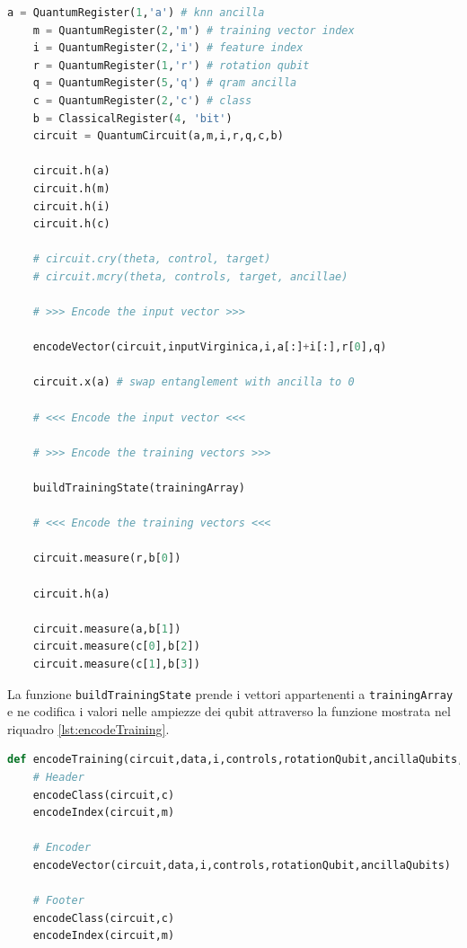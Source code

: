 \begin{lstlisting}[float=h!,language=Python,frame=tb,caption={Algoritmo per il QKNN multiclasse},label=lst:multiclasse]
    a = QuantumRegister(1,'a') # knn ancilla
    m = QuantumRegister(2,'m') # training vector index
    i = QuantumRegister(2,'i') # feature index
    r = QuantumRegister(1,'r') # rotation qubit
    q = QuantumRegister(5,'q') # qram ancilla
    c = QuantumRegister(2,'c') # class
    b = ClassicalRegister(4, 'bit')
    circuit = QuantumCircuit(a,m,i,r,q,c,b)

    circuit.h(a)
    circuit.h(m)
    circuit.h(i)
    circuit.h(c)

    # circuit.cry(theta, control, target)
    # circuit.mcry(theta, controls, target, ancillae)

    # >>> Encode the input vector >>>

    encodeVector(circuit,inputVirginica,i,a[:]+i[:],r[0],q)

    circuit.x(a) # swap entanglement with ancilla to 0

    # <<< Encode the input vector <<<

    # >>> Encode the training vectors >>>

    buildTrainingState(trainingArray)

    # <<< Encode the training vectors <<<

    circuit.measure(r,b[0])

    circuit.h(a)

    circuit.measure(a,b[1])
    circuit.measure(c[0],b[2])
    circuit.measure(c[1],b[3])
\end{lstlisting}

La funzione \texttt{buildTrainingState} prende i vettori appartenenti a \texttt{trainingArray} 
e ne codifica i valori nelle ampiezze dei qubit attraverso la funzione mostrata 
nel riquadro \ref{lst:encodeTraining}. 

\begin{lstlisting}[float=h!,language=Python,frame=tb,caption={Funzione per codificare i vettori},label=lst:encodeTraining]
    def encodeTraining(circuit,data,i,controls,rotationQubit,ancillaQubits,c,m):
    # Header
    encodeClass(circuit,c)
    encodeIndex(circuit,m)
    
    # Encoder
    encodeVector(circuit,data,i,controls,rotationQubit,ancillaQubits)
    
    # Footer
    encodeClass(circuit,c)
    encodeIndex(circuit,m)
\end{lstlisting}

